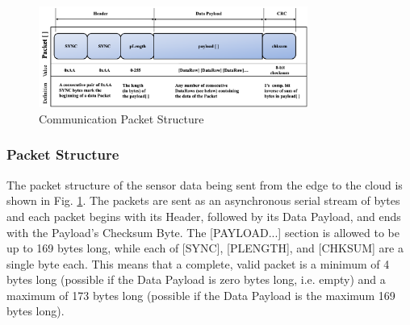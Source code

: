 \documentclass[conference]{IEEEtran}
\begin{document}
\begin{figure}[htbp]
\centering
\includegraphics[width=250pt]{packet.png}
\caption{Communication Packet Structure}
\label{packet}
\end{figure}

\subsubsection{Packet Structure}
The packet structure of the sensor data being sent from the edge to the cloud is shown in Fig. \ref{packet}. The packets are sent as an asynchronous serial stream of bytes and each packet begins with its Header, followed by its Data Payload, and ends with the Payload's Checksum Byte. The [PAYLOAD...] section is allowed to be up to 169 bytes long, while each of [SYNC], [PLENGTH], and [CHKSUM] are a single byte each. This means that a complete, valid packet is a minimum of 4 bytes long (possible if the Data Payload is zero bytes long, i.e. empty) and a maximum of 173 bytes long (possible if the Data Payload is the maximum 169 bytes long).
\end{document}
